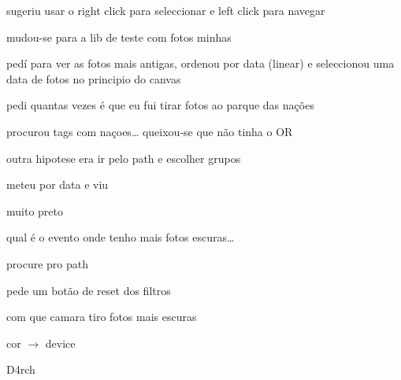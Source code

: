 \begin{myitemize}
	\item sugeriu usar o right click para seleccionar e left click para navegar


	\item mudou-se para a lib de teste com fotos minhas

	\item pedí para ver as fotos mais antigas, ordenou por data (linear) e seleccionou uma data de fotos no principio do canvas


	\item pedi quantas vezes é que eu fui tirar fotos ao parque das nações

	\item procurou tags com naçoes… queixou-se que não tinha o OR 

	\item outra hipotese era ir pelo path e escolher grupos

	\item meteu por data e viu


	\item muito preto


	\item qual é o evento onde tenho mais fotos escuras…

	\item procure pro path


	\item pede um botão de reset dos filtros


	\item com que camara tiro fotos mais escuras

	\item cor $\rightarrow$ device

\end{myitemize}



D4rch

